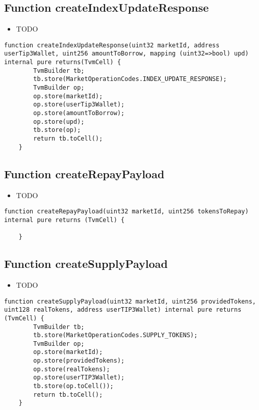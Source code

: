 \subsection{Function createIndexUpdateResponse}

\noindent\begin{itemize}
\item TODO
\end{itemize}

\begin{lstlisting}[firstnumber=106]
    function createIndexUpdateResponse(uint32 marketId, address userTip3Wallet, uint256 amountToBorrow, mapping (uint32=>bool) upd) internal pure returns(TvmCell) {
        TvmBuilder tb;
        tb.store(MarketOperationCodes.INDEX_UPDATE_RESPONSE);
        TvmBuilder op;
        op.store(marketId);
        op.store(userTip3Wallet);
        op.store(amountToBorrow);
        op.store(upd);
        tb.store(op);
        return tb.toCell();
    }
\end{lstlisting}

\subsection{Function createRepayPayload}

\noindent\begin{itemize}
\item TODO
\end{itemize}

\begin{lstlisting}[firstnumber=37]
    function createRepayPayload(uint32 marketId, uint256 tokensToRepay) internal pure returns (TvmCell) {

    }
\end{lstlisting}

\subsection{Function createSupplyPayload}

\noindent\begin{itemize}
\item TODO
\end{itemize}

\begin{lstlisting}[firstnumber=9]
    function createSupplyPayload(uint32 marketId, uint256 providedTokens, uint128 realTokens, address userTIP3Wallet) internal pure returns (TvmCell) {
        TvmBuilder tb;
        tb.store(MarketOperationCodes.SUPPLY_TOKENS);
        TvmBuilder op;
        op.store(marketId);
        op.store(providedTokens);
        op.store(realTokens);
        op.store(userTIP3Wallet);
        tb.store(op.toCell());
        return tb.toCell();
    }
\end{lstlisting}


